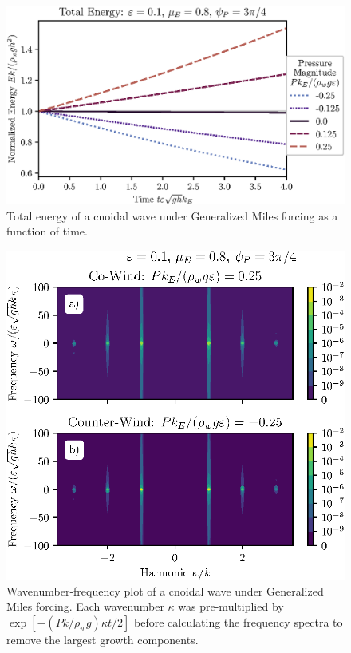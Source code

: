 \documentclass{jfm}
\begin{document}
\begin{figure}
  \centering
  \includegraphics{Total-Energy-GM.eps}
  \caption{
    Total energy of a cnoidal wave under Generalized Miles forcing as a
    function of time.
  }
\end{figure}

\begin{figure}
  \centering
  \includegraphics{Double-Power-Spectrum-GM.eps}
  \caption{
    Wavenumber-frequency plot of a cnoidal wave under Generalized Miles
    forcing.
    Each wavenumber $\kappa$ was pre-multiplied by $\exp[-(P k/\rho_w
    g) \kappa t/2]$ before calculating the frequency spectra to remove
    the largest growth components.
  }
\end{figure}
\end{document}
